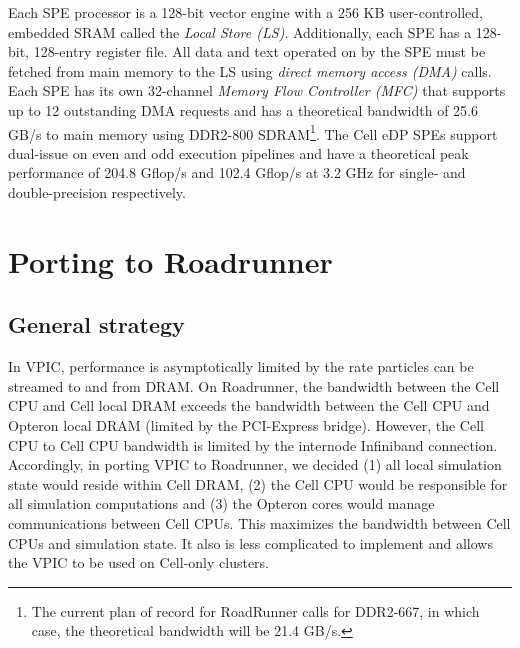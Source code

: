 \documentclass[10pt]{article}
\begin{document}
Each SPE processor is a 128-bit vector engine with a 256 KB
user-controlled, embedded SRAM called the \emph{Local Store (LS)}.
Additionally, each SPE has a 128-bit, 128-entry register file.  All
data and text operated on by the SPE must be fetched from main memory
to the LS using \emph{direct memory access (DMA)} calls.  Each SPE has
its own 32-channel \emph{Memory Flow Controller (MFC)} that supports
up to 12 outstanding DMA requests and has a theoretical bandwidth of
25.6 GB/s to main memory using DDR2-800 SDRAM\footnote{The current
plan of record for RoadRunner calls for DDR2-667, in which case, the
theoretical bandwidth will be 21.4 GB/s.}.  The Cell eDP SPEs support
dual-issue on even and odd execution pipelines and have a theoretical
peak performance of 204.8 Gflop/s and 102.4 Gflop/s at 3.2 GHz for
single- and double-precision respectively.


\section{Porting to Roadrunner}

\subsection{General strategy}

In VPIC, performance is asymptotically limited by the rate particles
can be streamed to and from DRAM.  On Roadrunner, the bandwidth
between the Cell CPU and Cell local DRAM exceeds the bandwidth between
the Cell CPU and Opteron local DRAM (limited by the PCI-Express
bridge).  However, the Cell CPU to Cell CPU bandwidth is limited by
the internode Infiniband connection.  Accordingly, in porting VPIC to
Roadrunner, we decided (1) all local simulation state would reside
within Cell DRAM, (2) the Cell CPU would be responsible for all
simulation computations and (3) the Opteron cores would manage
communications between Cell CPUs.  This maximizes the bandwidth
between Cell CPUs and simulation state.  It also is less complicated
to implement and allows the VPIC to be used on Cell-only clusters.
\end{document}
